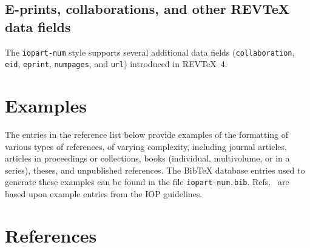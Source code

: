 \documentclass[12pt]{iopart}
\newcommand{\BibTeX}{Bib\TeX}
\newcommand{\REVTeX}{REV\TeX}
\begin{document}
\subsection{E-prints, collaborations, and other \REVTeX{} data fields}

The \texttt{iopart-num} style supports several additional data fields
(\verb+collaboration+, \verb+eid+, \verb+eprint+, 
\verb+numpages+, and \verb+url+) introduced in
\REVTeX{}~4.


\section{Examples}

The entries in the reference list below provide examples of the
formatting of various types of references, of varying complexity,
including journal articles, articles in proceedings or collections,
books (individual, multivolume, or in a series), theses, and
unpublished references.  The
\BibTeX{} database entries used to generate these examples can be
found in the file \texttt{iopart-num.bib}.
Refs.~\cite{ex1,ex2,ex3,ex4,ex5,ex6,ex7,ex8,ex9} are based upon example entries
from the IOP guidelines.

\section*{References}

\end{document}
